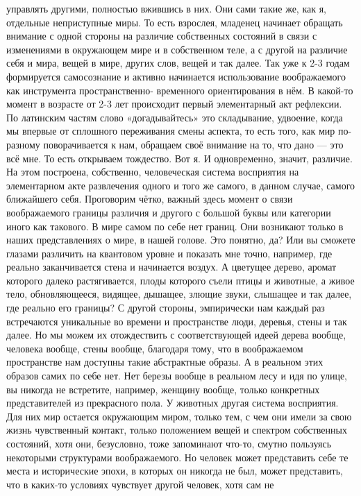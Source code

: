 управлять другими, полностью вжившись в них. Они сами такие же, как я, отдельные
неприступные миры. То есть взрослея, младенец начинает обращать внимание с одной
стороны на различие собственных состояний в связи с изменениями в окружающем
мире и в собственном теле, а с другой на различие себя и мира, вещей в мире,
других слов, вещей и так далее. Так уже к 2-3 годам формируется самосознание и
активно начинается использование воображаемого как инструмента пространственно-
временного ориентирования в нём. В какой-то момент в возрасте от 2-3 лет
происходит первый элементарный акт рефлексии. По латинским частям слово
«догадывайтесь» это складывание, удвоение, когда мы впервые от сплошного
переживания смены аспекта, то есть того, как мир по-разному поворачивается к
нам, обращаем своё внимание на то, что дано — это всё мне. То есть открываем
тождество. Вот я. И одновременно, значит, различие. На этом построена,
собственно, человеческая система восприятия на элементарном акте развлечения
одного и того же самого, в данном случае, самого ближайшего себя. Проговорим
чётко, важный здесь момент о связи воображаемого границы различия и другого с
большой буквы или категории иного как такового. В мире самом по себе нет границ.
Они возникают только в наших представлениях о мире, в нашей голове. Это понятно,
да? Или вы сможете глазами различить на квантовом уровне и показать мне точно,
например, где реально заканчивается стена и начинается воздух. А цветущее
дерево, аромат которого далеко растягивается, плоды которого съели птицы и
животные, а живое тело, обновляющееся, видящее, дышащее, злющие звуки, слышащее
и так далее, где реально его границы? С другой стороны, эмпирически нам каждый
раз встречаются уникальные во времени и пространстве люди, деревья, стены и так
далее. Но мы можем их отождествить с соответствующей идеей дерева вообще,
человека вообще, стены вообще, благодаря тому, что в воображаемом пространстве
нам доступны такие абстрактные образы. А в реальном этих образов самих по себе
нет. Нет березы вообще в реальном лесу и идя по улице, вы никогда не встретите,
например, женщину вообще, только конкретных представителей из прекрасного пола.
У животных другая система восприятия. Для них мир остается окружающим миром,
только тем, с чем они имели за свою жизнь чувственный контакт, только положением
вещей и спектром собственных состояний, хотя они, безусловно, тоже запоминают
что-то, смутно пользуясь некоторыми структурами воображаемого. Но человек может
представить себе те места и исторические эпохи, в которых он никогда не был,
может представить, что в каких-то условиях чувствует другой человек, хотя сам не
